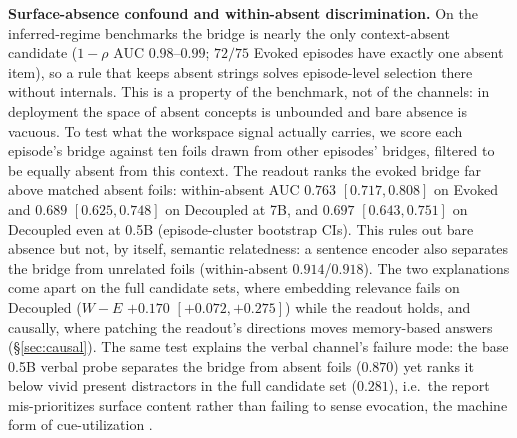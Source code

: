 \textbf{Surface-absence confound and within-absent discrimination.} On the
inferred-regime benchmarks the bridge is nearly the only context-absent
candidate ($1{-}\rho$ AUC $0.98$--$0.99$; $72/75$ Evoked episodes have
exactly one absent item), so a rule that keeps absent strings solves
episode-level selection there without internals. This is a property of the
benchmark, not of the channels: in deployment the space of absent concepts is
unbounded and bare absence is vacuous. To test what the workspace signal
actually carries, we score each episode's bridge against ten foils drawn from
other episodes' bridges, filtered to be equally absent from this context. The
readout ranks the evoked bridge far above matched absent foils:
within-absent AUC $0.763$ $[0.717, 0.808]$ on Evoked and $0.689$
$[0.625, 0.748]$ on Decoupled at 7B, and $0.697$ $[0.643, 0.751]$ on
Decoupled even at 0.5B (episode-cluster bootstrap CIs). This rules out bare
absence but not, by itself, semantic relatedness: a sentence encoder also
separates the bridge from unrelated foils (within-absent $0.914$/$0.918$).
The two explanations come apart on the full candidate sets, where embedding
relevance fails on Decoupled ($W{-}E$ $+0.170$ $[+0.072, +0.275]$) while the
readout holds, and causally, where patching the readout's directions moves
memory-based answers (\S\ref{sec:causal}). The same test explains the verbal channel's failure
mode: the base 0.5B verbal probe separates the bridge from absent foils
($0.870$) yet ranks it below vivid present distractors in the full candidate
set ($0.281$), i.e.\ the report mis-prioritizes surface content rather than
failing to sense evocation, the machine form of cue-utilization
\citep{koriat1997}.

